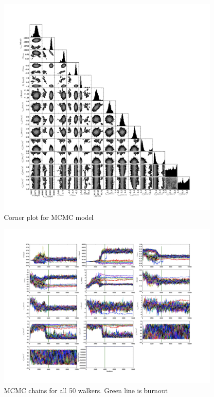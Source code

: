 \documentclass{article}
\begin{document}
\begin{figure}[!htb]
\centering
\includegraphics[width=\textwidth]{corner_10000.jpg}
\caption{Corner plot for MCMC model}
\end{figure}

\begin{figure}[!htb]
\centering
\includegraphics[width=\textwidth]{chainPlot_10000.jpg}
\caption{MCMC chains for all 50 walkers. Green line is burnout}
\end{figure}
\end{document}
